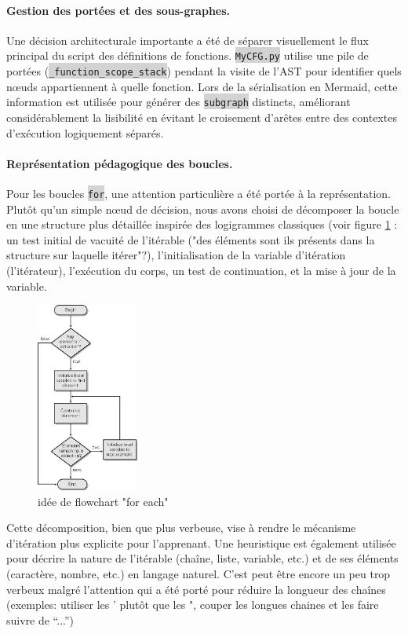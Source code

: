 \documentclass[11pt,a4paper]{article}
\let\cite\parencite
\newcommand{\code}[1]{\colorbox{lightgray}{\texttt{\small #1}}}
\begin{document}
\paragraph{Gestion des portées et des sous-graphes.} Une décision architecturale importante a été de séparer visuellement le flux principal du script des définitions de fonctions. \code{MyCFG.py} utilise une pile de portées (\code{\_function\_scope\_stack}) pendant la visite de l'AST pour identifier quels nœuds appartiennent à quelle fonction. Lors de la sérialisation en Mermaid, cette information est utilisée pour générer des \code{subgraph} distincts, améliorant considérablement la lisibilité en évitant le croisement d'arêtes entre des contextes d'exécution logiquement séparés.

\paragraph{Représentation pédagogique des boucles.} Pour les boucles \code{for}, une attention particulière a été portée à la représentation. Plutôt qu'un simple nœud de décision, nous avons choisi de décomposer la boucle en une structure plus détaillée inspirée des logigrammes classiques (voir figure \ref{foreach_flowchart} : un test initial de vacuité de l'itérable ("des éléments sont ils présents dans la structure sur laquelle itérer"?), l'initialisation de la variable d'itération (l'itérateur), l'exécution du corps, un test de continuation, et la mise à jour de la variable. 
\begin{figure}[H]
    \centering
    \includegraphics[width=0.3\textwidth]{FqKSJ.jpg}
    \caption{idée de flowchart "for each" \cite{FqKSJ}}
    \label{foreach_flowchart}
\end{figure}

Cette décomposition, bien que plus verbeuse, vise à rendre le mécanisme d'itération plus explicite pour l'apprenant. Une heuristique est également utilisée pour décrire la nature de l'itérable (chaîne, liste, variable, etc.) et de ses éléments (caractère, nombre, etc.) en langage naturel. C'est peut être encore un peu trop verbeux malgré l'attention qui a été porté pour réduire la longueur des chaînes (exemples: utiliser les ' plutôt que les ", couper les longues chaines et les faire suivre de ``...'')
\end{document}
